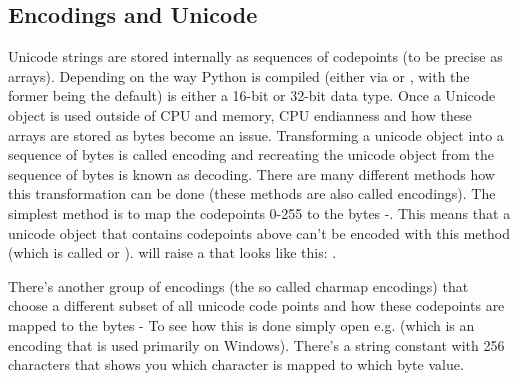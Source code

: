 \subsection{Encodings and Unicode\label{encodings-overview}}

Unicode strings are stored internally as sequences of codepoints (to
be precise as  arrays). Depending on the way Python is
compiled (either via  or 
, with the former being the default)
 is either a 16-bit or
32-bit data type. Once a Unicode object is used outside of CPU and
memory, CPU endianness and how these arrays are stored as bytes become
an issue. Transforming a unicode object into a sequence of bytes is
called encoding and recreating the unicode object from the sequence of
bytes is known as decoding. There are many different methods how this
transformation can be done (these methods are also called encodings).
The simplest method is to map the codepoints 0-255 to the bytes
-. This means that a unicode object that contains 
codepoints above  can't be encoded with this method (which 
is called  or ).
 will raise a 
that looks like this: .

There's another group of encodings (the so called charmap encodings)
that choose a different subset of all unicode code points and how
these codepoints are mapped to the bytes -
To see how this is done simply open e.g. 
(which is an encoding that is used primarily on Windows).
There's a string constant with 256 characters that shows you which 
character is mapped to which byte value.

